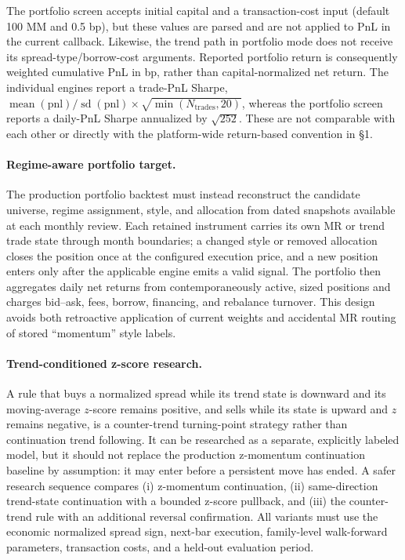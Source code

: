 The portfolio screen accepts initial capital and a transaction-cost input (default
100 MM and 0.5 bp), but these values are parsed and are not applied to PnL in the
current callback. Likewise, the trend path in portfolio mode does not receive its
spread-type/borrow-cost arguments. Reported portfolio return is consequently
weighted cumulative PnL in bp, rather than capital-normalized net return. The
individual engines report a trade-PnL Sharpe,
$\operatorname{mean}(\mathrm{pnl})/\operatorname{sd}(\mathrm{pnl})\times\sqrt{\min(N_{\mathrm{trades}},20)}$,
whereas the portfolio screen reports a daily-PnL Sharpe annualized by
$\sqrt{252}$. These are not comparable with each other or directly with the
platform-wide return-based convention in \S1.

\paragraph{Regime-aware portfolio target.} The production portfolio backtest must
instead reconstruct the candidate universe, regime assignment, style, and allocation
from dated snapshots available at each monthly review. Each retained instrument carries
its own MR or trend trade state through month boundaries; a changed style or removed
allocation closes the position once at the configured execution price, and a new
position enters only after the applicable engine emits a valid signal. The portfolio
then aggregates daily net returns from contemporaneously active, sized positions and
charges bid--ask, fees, borrow, financing, and rebalance turnover. This design avoids
both retroactive application of current weights and accidental MR routing of stored
``momentum'' style labels.

\paragraph{Trend-conditioned z-score research.} A rule that buys a normalized spread
while its trend state is downward and its moving-average $z$-score remains positive,
and sells while its state is upward and $z$ remains negative, is a counter-trend
turning-point strategy rather than continuation trend following. It can be researched
as a separate, explicitly labeled model, but it should not replace the production
z-momentum continuation baseline by assumption: it may enter before a persistent move
has ended. A safer research sequence compares (i) z-momentum continuation,
(ii) same-direction trend-state continuation with a bounded z-score pullback,
and (iii) the counter-trend rule with an additional reversal confirmation. All variants
must use the economic normalized spread sign, next-bar execution, family-level
walk-forward parameters, transaction costs, and a held-out evaluation period.

